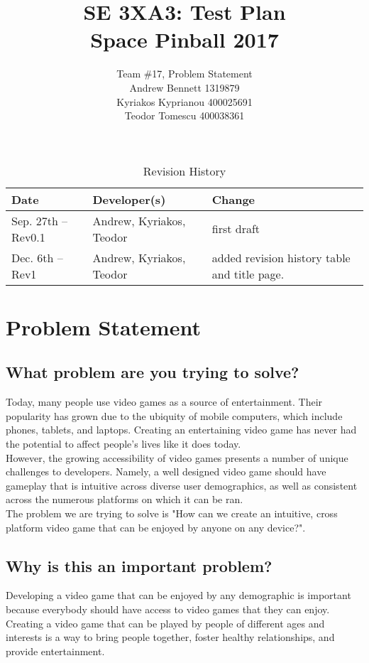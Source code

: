 \documentclass{article}
\title{SE 3XA3: Test Plan\\Space Pinball 2017}
\author{Team \#17, Problem Statement
		\\ Andrew Bennett 1319879
		\\ Kyriakos Kyprianou  400025691
		\\ Teodor Tomescu 400038361
}
\date{}
\begin{document}
\begin{table}[hp]
\caption{Revision History} \label{TblRevisionHistory}
\begin{tabularx}{\textwidth}{llX}
\toprule
\textbf{Date} & \textbf{Developer(s)} & \textbf{Change}\\
\midrule
Sep. 27th -- Rev0.1 	& Andrew, Kyriakos, Teodor & first draft \\
Dec. 6th  -- Rev1		& Andrew, Kyriakos, Teodor & added revision history table and title page.\\

\bottomrule
\end{tabularx}
\end{table}

\newpage
\maketitle
\newpage

\section{Problem Statement}
\subsection{What problem are you trying to solve?}

Today, many people use video games as a source of entertainment. Their popularity has grown due to the ubiquity of mobile computers, which include phones, tablets, and laptops. Creating an entertaining video game has never had the potential to affect people’s lives like it does today.\\

However, the growing accessibility of video games presents a number of unique challenges to developers. Namely, a well designed video game should have gameplay that is intuitive across diverse user demographics, as well as consistent across the numerous platforms on which it can be ran.\\

The problem we are trying to solve is "How can we create an intuitive, cross platform video game that can be enjoyed by anyone on any device?".


\subsection{Why is this an important problem?}
Developing a video game that can be enjoyed by any demographic is important because everybody should have access to video games that they can enjoy. Creating a video game that can be played by people of different ages and interests is a way to bring people together, foster healthy relationships, and provide entertainment. \\
\end{document}
